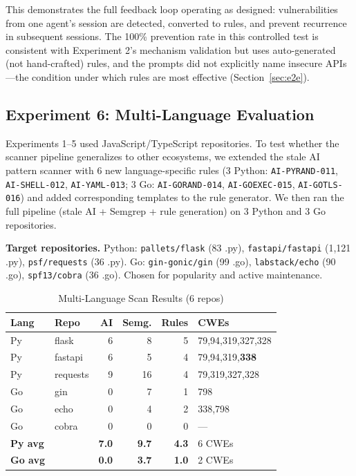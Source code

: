 \documentclass[conference,10pt]{IEEEtran}
\begin{document}
This demonstrates the full feedback loop operating as designed: vulnerabilities from one agent's session are detected, converted to rules, and prevent recurrence in subsequent sessions. The 100\% prevention rate in this controlled test is consistent with Experiment 2's mechanism validation but uses auto-generated (not hand-crafted) rules, and the prompts did not explicitly name insecure APIs---the condition under which rules are most effective (Section~\ref{sec:e2e}).

\subsection{Experiment 6: Multi-Language Evaluation}
\label{sec:multilang}

Experiments 1--5 used JavaScript/TypeScript repositories. To test whether the scanner pipeline generalizes to other ecosystems, we extended the stale AI pattern scanner with 6 new language-specific rules (3 Python: \texttt{AI-PYRAND-011}, \texttt{AI-SHELL-012}, \texttt{AI-YAML-013}; 3 Go: \texttt{AI-GORAND-014}, \texttt{AI-GOEXEC-015}, \texttt{AI-GOTLS-016}) and added corresponding templates to the rule generator. We then ran the full pipeline (stale AI + Semgrep + rule generation) on 3 Python and 3 Go repositories.

\textbf{Target repositories.} Python: \texttt{pallets/flask} (83 .py), \texttt{fastapi/fastapi} (1,121 .py), \texttt{psf/requests} (36 .py). Go: \texttt{gin-gonic/gin} (99 .go), \texttt{labstack/echo} (90 .go), \texttt{spf13/cobra} (36 .go). Chosen for popularity and active maintenance.

\begin{table}[h]
\centering
\caption{Multi-Language Scan Results (6 repos)}
\label{tab:multilang}
\begin{tabular}{llrrrl}
\toprule
\textbf{Lang} & \textbf{Repo} & \textbf{AI} & \textbf{Semg.} & \textbf{Rules} & \textbf{CWEs} \\
\midrule
Py & flask    & 6 & 8  & 5 & 79,94,319,327,328 \\
Py & fastapi  & 6 & 5  & 4 & 79,94,319,\textbf{338} \\
Py & requests & 9 & 16 & 4 & 79,319,327,328 \\
\midrule
Go & gin      & 0 & 7 & 1 & 798 \\
Go & echo     & 0 & 4 & 2 & 338,798 \\
Go & cobra    & 0 & 0 & 0 & --- \\
\midrule
\textbf{Py avg} & & \textbf{7.0} & \textbf{9.7} & \textbf{4.3} & 6 CWEs \\
\textbf{Go avg} & & \textbf{0.0} & \textbf{3.7} & \textbf{1.0} & 2 CWEs \\
\bottomrule
\end{tabular}
\end{table}
\end{document}
